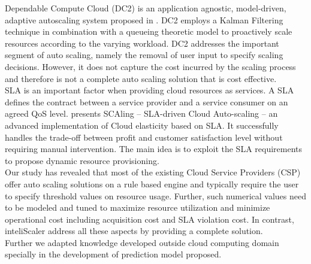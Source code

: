 Dependable Compute Cloud (DC2) is an application agnostic, model-driven, adaptive autoscaling system proposed in \cite{modeldriven}. DC2 employs a Kalman Filtering technique in combination with a queueing theoretic model to proactively scale resources according to the varying workload. DC2 addresses the important segment of auto scaling, namely the removal of user input to specify scaling decisions. However, it does not capture the cost incurred by the scaling process and therefore is not a complete auto scaling solution that is cost effective.\\

SLA is an important factor when providing cloud resources as services. A SLA defines the contract between a service provider and a service consumer on an agreed QoS level. \cite{sladriven} presents SCAling – SLA-driven Cloud Auto-scaling – an advanced implementation of Cloud elasticity based on SLA. It successfully handles the trade-off between profit and customer satisfaction level without requiring manual intervention. The main idea is to exploit the SLA requirements to propose dynamic resource provisioning.\\

Our study has revealed that most of the existing Cloud Service Providers (CSP) offer auto scaling solutions on a rule based engine and typically require the user to specify threshold values on resource usage. Further, such numerical values need to be modeled and tuned to maximize resource utilization and minimize operational cost including acquisition cost and SLA violation cost. In contrast, inteliScaler address all these aspects by providing a complete solution.\\

Further we adapted knowledge developed outside cloud computing domain specially in the development of prediction model proposed.\\


